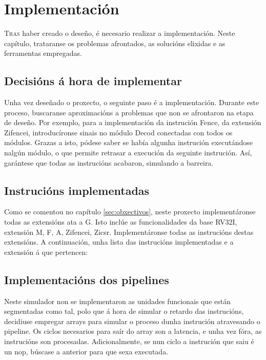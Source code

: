 \chapter{Implementación}
\label{chap:implementacion}

\lettrine{T}{ras} haber creado o deseño, é necesario realizar a implementación. Neste capítulo, trataranse os problemas afrontados, as solucións elixidas e as ferramentas empregadas.

\section{Decisións á hora de implementar}\label{sec:decisions}
Unha vez deseñado o proxecto, o seguinte paso é a implementación. Durante este proceso, buscaranse aproximacións a problemas que non se afrontaron na etapa de deseño. Por exemplo, para a implementación da instrución Fence, da extensión Zifencei, introducíronse sinais no módulo Decod conectadas con todos os módulos. Grazas a isto, pódese saber se había algunha instrución executándose nalgún módulo, o que permite retrasar a execución da seguinte instrución. Así, garántese que todas as instrucións acabaron, simulando a barreira.


\section{Instrucións implementadas}\label{sec:intrucions_implt}
Como se comentou no capítulo \ref{sec:obxectivos}, neste proxecto implementáronse todas as extensións ata a G. Isto inclúe as funcionalidades da base RV32I, extensión M, F, A, Zifencei, Zicsr. Implementáronse todas as instrucións destas extensións. A continuación, unha lista das instrucións implementadas e a extensión á que pertencen:



\section{Implementacións dos pipelines}\label{sec:implt_pipelines}
Neste simulador non se implementaron as unidades funcionais que están segmentadas como tal, polo que á hora de simular o retardo das instrucións, decidiuse empregar arrays para simular o proceso dunha instrución atravesando o pipeline. Os ciclos necesarios para saír do array son a latencia, e unha vez fóra, as instrucións son procesadas. Adicionalmente, se nun ciclo a instrución que saiu é un \acrfull{nop}, búscase a anterior para que sexa executada. 

